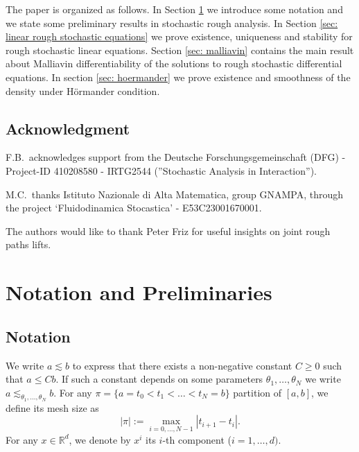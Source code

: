 \documentclass[11pt,a4paper]{article}
\newcommand{\R}{\mathbb{R}}
\theoremstyle{plain}
\begin{document}

The paper is organized as follows.
In Section \ref{sec: notation} we introduce some notation and we state some preliminary results in stochastic rough analysis. In Section \ref{sec: linear rough stochastic equations} we prove existence, uniqueness and stability for rough stochastic linear equations. Section \ref{sec: malliavin} contains the main result about Malliavin differentiability of the solutions to rough stochastic differential equations. In section \ref{sec: hoermander} we prove existence and smoothness of the density under Hörmander condition.


\subsection*{Acknowledgment}
F.B.\ acknowledges support from the Deutsche Forschungsgemeinschaft (DFG) - Project-ID 410208580 - IRTG2544 (”Stochastic Analysis in Interaction”).


M.C.\ thanks Istituto Nazionale di
Alta Matematica, group GNAMPA, through the project ‘Fluidodinamica Stocastica’ - E53C23001670001.

The authors would like to thank Peter Friz for useful insights on joint rough paths lifts.




\section{Notation and Preliminaries}
\label{sec: notation}

\subsection{Notation} We write $a \lesssim b$ to express that there exists a non-negative constant $C\ge 0$ such that $a \le Cb$. If such a constant depends on some parameters $\theta_1,\dots,\theta_N$ we write $a \lesssim_{\theta_1,\dots,\theta_N} b$.
For any $\pi=\{a=t_0 < t_1< \dots <t_N=b \}$ partition of $[a,b]$, we define its mesh size as \begin{equation*}
    |\pi| := \max_{i=0,\dots,N-1} |t_{i+1}-t_i|.
\end{equation*}
For any $x \in \R^d$, we denote by $x^i$ its $i$-th component ($i=1,\dots,d)$. 
\end{document}
